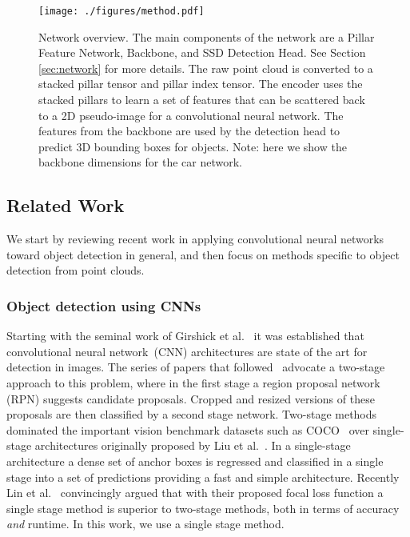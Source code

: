 \documentclass[10pt,twocolumn,letterpaper]{article}
\newcommand{\squeeze}{\vspace{-0.5mm}}
\begin{document}
\begin{figure*}
\begin{center}
\texttt{[image: ./figures/method.pdf]}
\end{center}
\squeeze
\caption{Network overview.
The main components of the network are a Pillar Feature Network, Backbone, and SSD Detection Head.
See Section \ref{sec:network} for more details.
The raw point cloud is converted to a stacked pillar tensor and pillar index tensor.
The encoder uses the stacked pillars to learn a set of features that can be scattered back to a 2D pseudo-image for a convolutional neural network.
The features from the backbone are used by the detection head to predict 3D bounding boxes for objects.
Note: here we show the backbone dimensions for the car network.}
\label{fig:network}
\label{fig:pointpillar}
\end{figure*}

\subsection{Related Work}
\squeeze
We start by reviewing recent work in applying convolutional neural networks toward object detection in general, and then focus on methods specific to object detection from \lidar point clouds.

\squeeze
\subsubsection{Object detection using CNNs}
\squeeze
Starting with the seminal work of Girshick et al.~\cite{girshick2014rich} it was established that convolutional neural network~(CNN) architectures are state of the art for detection in images.
The series of papers that followed~\cite{ren2015faster, he2017mask} advocate a two-stage approach to this problem, where in the first stage a region proposal network (RPN) suggests candidate proposals.
Cropped and resized versions of these proposals are then classified by a second stage network.
Two-stage methods dominated the important vision benchmark datasets such as COCO~\cite{coco} over single-stage architectures originally proposed by Liu et al.~\cite{ssd}.
In a single-stage architecture a dense set of anchor boxes is regressed and classified in a single stage into a set of predictions providing a fast and simple architecture.
Recently Lin et al.~\cite{retinanet} convincingly argued that with their proposed focal loss function a single stage method is superior to two-stage methods, both in terms of accuracy \emph{and} runtime. 
In this work, we use a single stage method.
\end{document}
